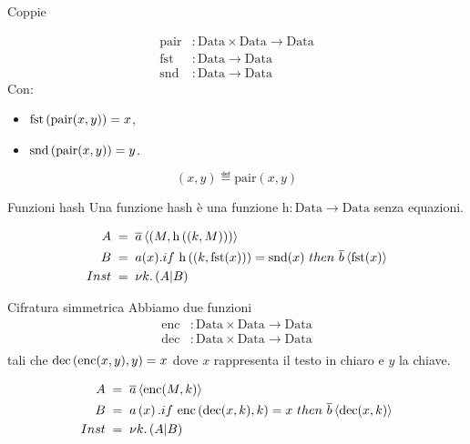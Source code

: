 \begin{frame}{Coppie}
  
  \begin{align*}
    \mathrm{pair} &: \mathrm{Data} \times \mathrm{Data} \rightarrow
                    \mathrm{Data} \\
    \mathrm{fst} &: \mathrm{Data} \rightarrow \mathrm{Data} \\
    \mathrm{snd} &: \mathrm{Data} \rightarrow \mathrm{Data}
  \end{align*}
  Con:
  \begin{itemize}
  \item $\mathrm{fst}\left(\mathrm{pair}(x,y)\right) = x$,
  \item $\mathrm{snd}\left(\mathrm{pair}(x,y)\right) = y$.
  \end{itemize}
  \vfill
  \[ (x,y) \eqdef \mathrm{pair}(x,y) \]

\end{frame}

\begin{frame}{Funzioni hash}
  Una funzione hash \`e una funzione $\mathrm{h}: \mathrm{Data}
  \rightarrow \mathrm{Data}$ senza equazioni.
  
  \begin{align*}
    A & \;=\; \overline{a}\left< \left(M,\mathrm{h}\left((k,M)\right)\right)\right> \\
    B & \;=\; a(x).if\ \mathrm{h}\left((k,\mathrm{fst}(x))\right) =
        \mathrm{snd}(x)\ then\ \overline{b}\left<\mathrm{fst}(x)\right> \\
    Inst & \;=\; \nu k.\left( A | B \right) 
  \end{align*}
\end{frame}

\begin{frame}{Cifratura simmetrica}
  Abbiamo due funzioni
  \begin{align*}
    \mathrm{enc} &: \mathrm{Data} \times \mathrm{Data} \rightarrow
                   \mathrm{Data} \\
    \mathrm{dec} &: \mathrm{Data} \times \mathrm{Data} \rightarrow
                   \mathrm{Data} \\
  \end{align*}
  tali che $\mathrm{dec}\left(\mathrm{enc}(x,y),y\right) = x$ dove $x$
  rappresenta il testo in chiaro e $y$ la chiave.
  \vfill
  
  \begin{align*}
    A & \;=\; \overline{a}\left<\mathrm{enc}(M,k)\right> \\
    B & \;=\; a\left(x\right).if\ \mathrm{enc}\left( \mathrm{dec}(x,k),k\right) =
        x\ then\ \overline{b}\left<\mathrm{dec}(x,k)\right> \\
    Inst & \;=\; \nu k. \left( A|B\right)
  \end{align*}
\end{frame}

